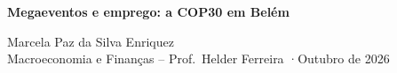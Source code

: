 \documentclass[12pt,a4paper]{report}
\begin{document}
\begin{titlepage}\centering\vspace*{4cm}
{\LARGE\bfseries Megaeventos e emprego: a COP30 em Belém\par}\vspace{1.5cm}
\vspace{6pt}
Marcela Paz da Silva Enriquez\\
Macroeconomia e Finanças -- Prof.\ Helder Ferreira \quad·\quad Outubro de 2026
\vfill\end{titlepage}



\end{document}
